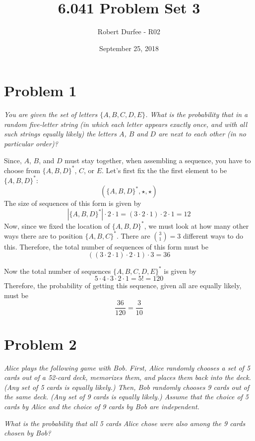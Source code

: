 \documentclass{article}
\title{6.041 Problem Set 3}
\author{Robert Durfee - R02}
\date{September 25, 2018}
\begin{document}
\maketitle

\section*{Problem 1}

\textit{You are given the set of letters $ \{ A, B, C, D, E \} $. What is the
probability that in a random five-letter string (in which each letter appears
exactly once, and with all such strings equally likely) the letters $ A $, $
B $ and $ D $ are next to each other (in no particular order)?}

\bigbreak

Since, $ A $, $ B $, and $ D $ must stay together, when assembling a sequence,
you have to choose from $ \{ A, B, D \}^* $, $ C $, or $ E $. Let's first
fix the the first element to be $ \{ A, B, D \}^* $:
$$ ( \{ A, B, D \}^*, \star, \star ) $$
The size of sequences of this form is given by
$$ | \{ A, B, D \}^* | \cdot 2 \cdot 1 = (3 \cdot 2 \cdot 1) \cdot 2 \cdot 1
= 12 $$
Now, since we fixed the location of $ \{ A, B, D \}^* $, we must look at how
many other ways there are to position $ \{ A, B, C \}^* $. There are $
\binom{3}{1} = 3 $ different ways to do this. Therefore, the total number of
sequences of this form must be
$$ ((3 \cdot 2 \cdot 1) \cdot 2 \cdot 1) \cdot 3 = 36 $$

Now the total number of sequences $ \{ A, B, C, D, E \}^* $ is given by
$$ 5 \cdot 4 \cdot 3 \cdot 2 \cdot 1 = 5! = 120 $$
Therefore, the probability of getting this sequence, given all are equally
likely, must be
$$ \frac{36}{120} = \frac{3}{10} $$

\section*{Problem 2}

\textit{Alice plays the following game with Bob. First, Alice randomly
chooses a set of 5 cards out of a 52-card deck, memorizes them, and places
them back into the deck. (Any set of 5 cards is equally likely.) Then, Bob
randomly chooses 9 cards out of the same deck. (Any set of 9 cards is equally
likely.) Assume that the choice of 5 cards by Alice and the choice of 9 cards
by Bob are independent.}

\textit{What is the probability that all 5 cards Alice chose were also among
the 9 cards chosen by Bob?}
\end{document}
